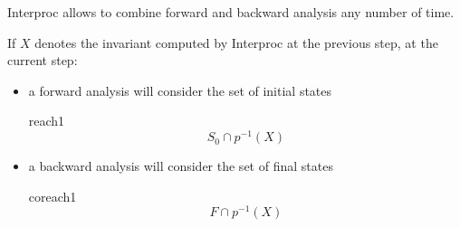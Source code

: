\documentclass[a4paper,11pt]{article}
\begin{document}
Interproc allows to combine forward and backward analysis any
number of time.

If $X$ denotes the invariant computed by Interproc at the
previous step, at the current step:
\begin{itemize}
\item a forward analysis will consider the set of
  initial states
  \htmlonly{\begin{quote}}\begin{image}{reach1}
    $$
    S_0 \cap p^{-1}(X)
    $$
   \end{image}\htmlonly{\end{quote}}
\item a backward analysis will consider the set of
  final states
  \htmlonly{\begin{quote}}\begin{image}{coreach1}
    $$
    F \cap p^{-1}(X)
    $$
   \end{image}\htmlonly{\end{quote}}
\end{itemize}
\end{document}
